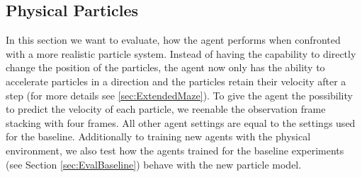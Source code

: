 \subsection{Physical Particles} \label{sec:EvalPhysical}
In this section we want to evaluate, how the agent performs when confronted with a more realistic particle system. Instead of having the capability to directly change the position of the particles, the agent now only has the ability to accelerate particles in a direction and the particles retain their velocity after a step (for more details see \ref{sec:ExtendedMaze}). To give the agent the possibility to predict the velocity of each particle, we reenable the observation frame stacking with four frames. All other agent settings are equal to the settings used for the baseline. Additionally to training new agents with the physical environment, we also test how the agents trained for the baseline experiments (see Section \ref{sec:EvalBaseline}) behave with the new particle model.

